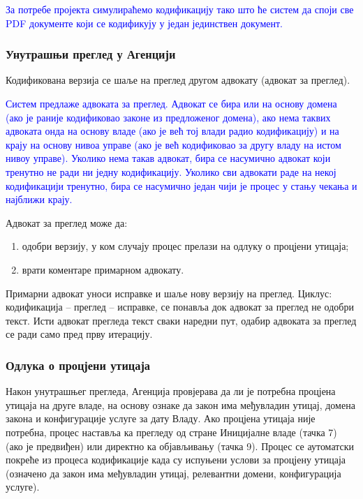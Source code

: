 \documentclass[12pt,a4paper]{article}
\newcommand{\optional}[1]{\textcolor{blue}{#1}}
\begin{document}
\optional{За потребе пројекта симулираћемо кодификацију тако што ће систем да споји све PDF документе који се кодификују у један јединствен документ.}

\subsubsection{Унутрашњи преглед у Агенцији}

Кодификована верзија се шаље на преглед другом адвокату (адвокат за преглед).

\optional{Систем предлаже адвоката за преглед. Адвокат се бира или на основу домена (ако је раније кодификовао законе из предложеног домена), ако нема таквих адвоката онда на основу владе (ако је већ тој влади радио кодификацију) и на крају на основу нивоа управе (ако је већ кодификовао за другу владу на истом нивоу управе). Уколико нема такав адвокат, бира се насумично адвокат који тренутно не ради ни једну кодификацију. Уколико сви адвокати раде на некој кодификацији тренутно, бира се насумично један чији је процес у стању чекања и најближи крају.}

Адвокат за преглед може да:
\begin{enumerate}[label=\alph*)]
    \item одобри верзију, у ком случају процес прелази на одлуку о процјени утицаја;
    \item врати коментаре примарном адвокату.
\end{enumerate}

Примарни адвокат уноси исправке и шаље нову верзију на преглед. Циклус: кодификација – преглед – исправке, се понавља док адвокат за преглед не одобри текст. Исти адвокат прегледа текст сваки наредни пут, одабир адвоката за преглед се ради само пред прву итерацију.

\subsubsection{Одлука о процјени утицаја}

Након унутрашњег прегледа, Агенција провјерава да ли је потребна процјена утицаја на друге владе, на основу ознаке да закон има међувладин утицај, домена закона и конфигурације услуге за дату Владу. Ако процјена утицаја није потребна, процес наставља ка прегледу од стране Иницијалне владе (тачка 7) (ако је предвиђен) или директно ка објављивању (тачка 9). Процес се аутоматски покреће из процеса кодификације када су испуњени услови за процјену утицаја (означено да закон има међувладин утицај, релевантни домени, конфигурација услуге).
\end{document}

